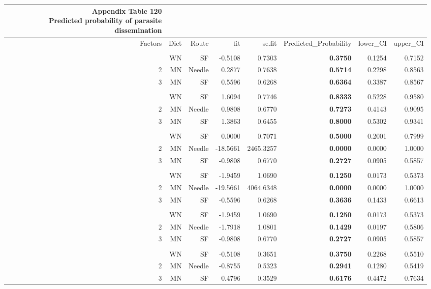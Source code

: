 \documentclass[
  12pt,
  letterpaper,
]{article}
\begin{document}
\begin{longtable}{rrrrrrrr}
\caption*{
{\large \textbf{Appendix Table 120}} \\ 
{\small \textbf{Predicted probability of parasite dissemination}}
} \\ 
\toprule
Factors & Diet & Route & fit & se.fit & Predicted\_Probability & lower\_CI & upper\_CI \\ 
\midrule\addlinespace[2.5pt]
\multicolumn{8}{l}{Brain} \\ 
\midrule\addlinespace[2.5pt]
1 & WN & SF & -0.5108 & 0.7303 & \textbf{0.3750} & 0.1254 & 0.7152 \\ 
2 & MN & Needle & 0.2877 & 0.7638 & \textbf{0.5714} & 0.2298 & 0.8563 \\ 
3 & MN & SF & 0.5596 & 0.6268 & \textbf{0.6364} & 0.3387 & 0.8567 \\ 
\midrule\addlinespace[2.5pt]
\multicolumn{8}{l}{Ear} \\ 
\midrule\addlinespace[2.5pt]
1 & WN & SF & 1.6094 & 0.7746 & \textbf{0.8333} & 0.5228 & 0.9580 \\ 
2 & MN & Needle & 0.9808 & 0.6770 & \textbf{0.7273} & 0.4143 & 0.9095 \\ 
3 & MN & SF & 1.3863 & 0.6455 & \textbf{0.8000} & 0.5302 & 0.9341 \\ 
\midrule\addlinespace[2.5pt]
\multicolumn{8}{l}{Eye} \\ 
\midrule\addlinespace[2.5pt]
1 & WN & SF & 0.0000 & 0.7071 & \textbf{0.5000} & 0.2001 & 0.7999 \\ 
2 & MN & Needle & -18.5661 & 2465.3257 & \textbf{0.0000} & 0.0000 & 1.0000 \\ 
3 & MN & SF & -0.9808 & 0.6770 & \textbf{0.2727} & 0.0905 & 0.5857 \\ 
\midrule\addlinespace[2.5pt]
\multicolumn{8}{l}{Liver} \\ 
\midrule\addlinespace[2.5pt]
1 & WN & SF & -1.9459 & 1.0690 & \textbf{0.1250} & 0.0173 & 0.5373 \\ 
2 & MN & Needle & -19.5661 & 4064.6348 & \textbf{0.0000} & 0.0000 & 1.0000 \\ 
3 & MN & SF & -0.5596 & 0.6268 & \textbf{0.3636} & 0.1433 & 0.6613 \\ 
\midrule\addlinespace[2.5pt]
\multicolumn{8}{l}{Paw} \\ 
\midrule\addlinespace[2.5pt]
1 & WN & SF & -1.9459 & 1.0690 & \textbf{0.1250} & 0.0173 & 0.5373 \\ 
2 & MN & Needle & -1.7918 & 1.0801 & \textbf{0.1429} & 0.0197 & 0.5806 \\ 
3 & MN & SF & -0.9808 & 0.6770 & \textbf{0.2727} & 0.0905 & 0.5857 \\ 
\midrule\addlinespace[2.5pt]
\multicolumn{8}{l}{Spleen} \\ 
\midrule\addlinespace[2.5pt]
1 & WN & SF & -0.5108 & 0.3651 & \textbf{0.3750} & 0.2268 & 0.5510 \\ 
2 & MN & Needle & -0.8755 & 0.5323 & \textbf{0.2941} & 0.1280 & 0.5419 \\ 
3 & MN & SF & 0.4796 & 0.3529 & \textbf{0.6176} & 0.4472 & 0.7634 \\ 
\bottomrule
\end{longtable}
\end{document}
